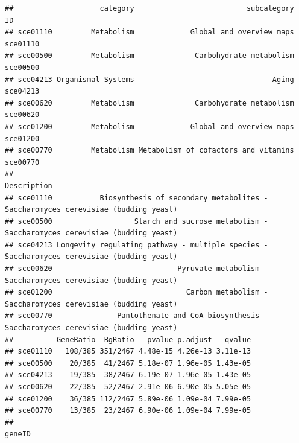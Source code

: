 \documentclass[
]{book}
\begin{document}
\begin{verbatim}
##                    category                          subcategory       ID
## sce01110         Metabolism             Global and overview maps sce01110
## sce00500         Metabolism              Carbohydrate metabolism sce00500
## sce04213 Organismal Systems                                Aging sce04213
## sce00620         Metabolism              Carbohydrate metabolism sce00620
## sce01200         Metabolism             Global and overview maps sce01200
## sce00770         Metabolism Metabolism of cofactors and vitamins sce00770
##                                                                                         Description
## sce01110           Biosynthesis of secondary metabolites - Saccharomyces cerevisiae (budding yeast)
## sce00500                   Starch and sucrose metabolism - Saccharomyces cerevisiae (budding yeast)
## sce04213 Longevity regulating pathway - multiple species - Saccharomyces cerevisiae (budding yeast)
## sce00620                             Pyruvate metabolism - Saccharomyces cerevisiae (budding yeast)
## sce01200                               Carbon metabolism - Saccharomyces cerevisiae (budding yeast)
## sce00770               Pantothenate and CoA biosynthesis - Saccharomyces cerevisiae (budding yeast)
##          GeneRatio  BgRatio   pvalue p.adjust   qvalue
## sce01110   108/385 351/2467 4.48e-15 4.26e-13 3.11e-13
## sce00500    20/385  41/2467 5.18e-07 1.96e-05 1.43e-05
## sce04213    19/385  38/2467 6.19e-07 1.96e-05 1.43e-05
## sce00620    22/385  52/2467 2.91e-06 6.90e-05 5.05e-05
## sce01200    36/385 112/2467 5.89e-06 1.09e-04 7.99e-05
## sce00770    13/385  23/2467 6.90e-06 1.09e-04 7.99e-05
##                                                                                                                                                                                                                                                                                                                                                                                                                                                                                                                                                                                                                                                                                                                                                                                                                                                                                                     geneID

\end{verbatim}
\end{document}

